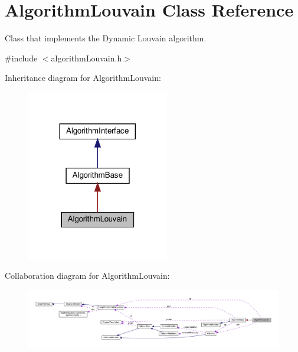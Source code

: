 \hypertarget{classAlgorithmLouvain}{}\section{Algorithm\+Louvain Class Reference}
\label{classAlgorithmLouvain}


Class that implements the Dynamic Louvain algorithm.  




{\ttfamily \#include $<$algorithm\+Louvain.\+h$>$}



Inheritance diagram for Algorithm\+Louvain\+:
\nopagebreak
\begin{figure}[H]
\begin{center}
\leavevmode
\includegraphics[width=176pt]{classAlgorithmLouvain__inherit__graph}
\end{center}
\end{figure}


Collaboration diagram for Algorithm\+Louvain\+:
\nopagebreak
\begin{figure}[H]
\begin{center}
\leavevmode
\includegraphics[width=350pt]{classAlgorithmLouvain__coll__graph}
\end{center}
\end{figure}

